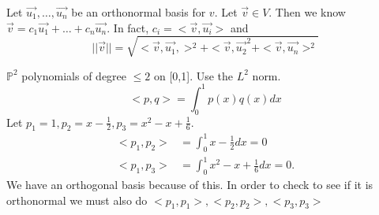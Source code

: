   \begin{theorem}
    Let $\vec{u_1},\ldots,\vec{u_n}$ be an orthonormal basis for $v$. Let $\vec{v}\in V$. Then we know $\vec{v}=c_1\vec{u_1}+\ldots+c_n \vec{u_n}$. In fact, $c_i=<\vec{v},\vec{u_i}>$ and 
    \begin{equation}
      | |\vec{v} | | = \sqrt{<\vec{v},\vec{u_1},>^2+<\vec{v},\vec{u_2}^2 + <\vec{v},\vec{u_n}>^2}
    \end{equation}
  \end{theorem}

  \begin{problem}
    $\mathbb{P}^2$ polynomials of degree $\le 2$ on [0,1]. Use the $L^2$ norm.
    \begin{equation}
      <p,q> = \int_0^{1}p(x)q(x)dx
    \end{equation}
    Let $p_1=1,p_2=x-\frac{1}{2},p_3=x^2-x+\frac{1}{6}$.
    \begin{align}
      <p_1,p_2> &= \int_0^{1}x-\frac{1}{2}dx=0\\
      <p_1,p_3>&=\int_0^{1}x^2-x+\frac{1}{6}dx=0.
    \end{align}
    We have an orthogonal basis because of this. In order to check to see if it is orthonormal we must also do $<p_1,p_1>,<p_2,p_2>,<p_3,p_3>$
  \end{problem}
